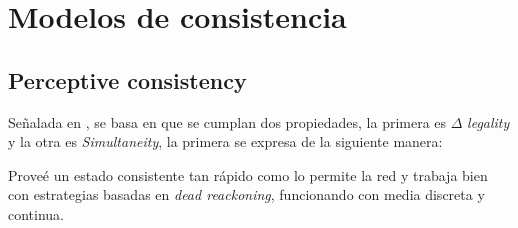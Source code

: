 \section{Modelos de consistencia}



\subsection{Perceptive consistency}

Señalada en \cite{bouillot2005fast}, se basa en que se cumplan dos propiedades, la primera es $\Delta$ \emph{legality} y la otra es \emph{Simultaneity}, la primera se expresa de la siguiente manera:



Proveé un estado consistente tan rápido como lo permite la red y trabaja bien con estrategias basadas en \emph{dead reackoning}, funcionando con media discreta y continua.



